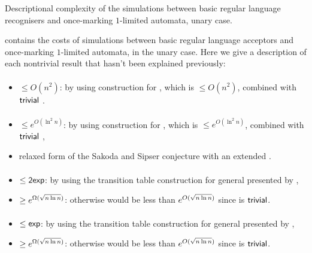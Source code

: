 \begin{table}
	\caption{Descriptional complexity of the simulations between basic regular language recognisers and once-marking $1$-limited automata, unary case.}
	\label{tab:sims-om-unary}
\end{table}

 contains the costs of simulations between basic regular language acceptors and once-marking $1$-limited automata, in the unary case.
Here we give a description of each nontrivial result that hasn't been explained previously:

\paragraph{\ONFA{}\tto\OMODLA}\label{cost:1NFAtoOM1DLAu}
\begin{itemize}
	\item $\le O(n^2)$: by using construction for \hyperref[cost:1NFAto2DFAu]{\ONFA{}\tto\TDFA}, which is $\le O(n^2)$, combined with $\mathsf{trivial}$ \TDFA{}\tto\OMODLA.
\end{itemize}
\paragraph{\TNFA{}\tto\OMODLA}
\begin{itemize}
	\item $\le e^{O(\ln^2n)}$: by using construction for \hyperref[cost:2NFAto2DFAu]{\TNFA{}\tto\TDFA}, which is $\le e^{O(\ln^2n)}$, combined with $\mathsf{trivial}$ \TDFA{}\tto\OMODLA,
	\item relaxed form of the Sakoda and Sipser conjecture with an extended \TDFA.
\end{itemize}
\paragraph{\OMOLA{}\tto\ODFA}
\begin{itemize}
	\item $\le\mathsf{2exp}$: by using the transition table construction for general \OLAs presented by ,
	\item $\ge e^{\Omega(\sqrt{n\ln n})}$: otherwise \hyperref[cost:2DFAto1DFAu]{\TDFA{}\tto\ODFA} would be less than $e^{O(\sqrt{n\ln n})}$ since \TDFA{}\tto\OMOLA is $\mathsf{trivial}$.
\end{itemize}
\paragraph{\OMOLA{}\tto\ONFA}\label{cost:OM1LAto1NFAu}
\begin{itemize}
	\item $\le\mathsf{exp}$: by using the transition table construction for general \OLAs presented by ,
	\item $\ge e^{\Omega(\sqrt{n\ln n})}$: otherwise \hyperref[cost:2DFAto1NFAu]{\TDFA{}\tto\ONFA} would be less than $e^{O(\sqrt{n\ln n})}$ since \TDFA{}\tto\OMOLA is $\mathsf{trivial}$.
\end{itemize}

